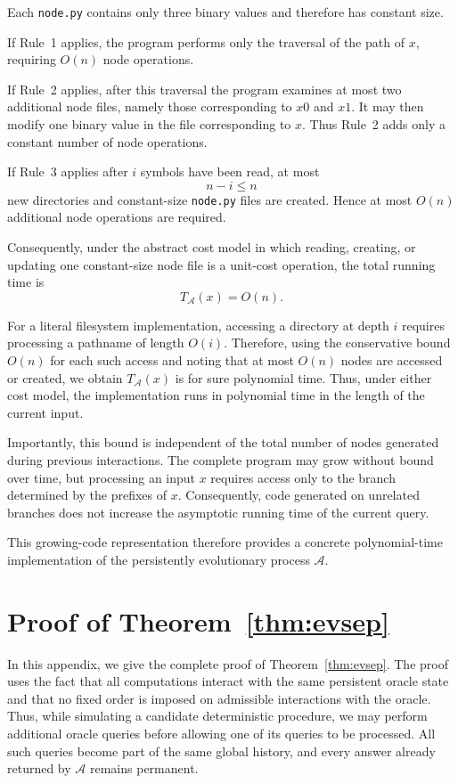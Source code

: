 \documentclass[11pt]{article}
\begin{document}
Each \texttt{node.py} contains only three binary values and therefore has
constant size.

If Rule~1 applies, the program performs only the traversal of the path of
\(x\), requiring \(O(n)\) node operations.

If Rule~2 applies, after this traversal the program examines at most two
additional node files, namely those corresponding to \(x0\) and \(x1\).
It may then modify one binary value in the file corresponding to \(x\).
Thus Rule~2 adds only a constant number of node operations.

If Rule~3 applies after \(i\) symbols have been read, at most
\[
n-i\le n
\]
new directories and constant-size \texttt{node.py} files are created.
Hence at most \(O(n)\) additional node operations are required.

Consequently, under the abstract cost model in which reading, creating, or
updating one constant-size node file is a unit-cost operation, the total
running time is
\[
T_{\mathcal A}(x)=O(n).
\]

For a literal filesystem implementation, accessing a directory at depth
\(i\)  requires processing a pathname of length \(O(i)\). Therefore, using the
conservative bound \(O(n)\) for each such access and noting that at most
\(O(n)\) nodes are accessed or created, we obtain
\(
T_{\mathcal A}(x)
\) is for sure polynomial time. 
Thus, under either cost model, the implementation runs in polynomial time
in the length of the current input.

Importantly, this bound is independent of the total number of nodes
generated during previous interactions.  The complete program may grow
without bound over time, but processing an input \(x\) requires access only
to the branch determined by the prefixes of \(x\).  Consequently, code
generated on unrelated branches does not increase the asymptotic running
time of the current query.

This growing-code representation therefore provides a concrete
polynomial-time implementation of the persistently evolutionary process
\(\mathcal A\).

\section{Proof of Theorem~\ref{thm:evsep}}
\label{app:evolutionary-separation}

In this appendix, we give the complete proof of
Theorem~\ref{thm:evsep}. The proof uses the fact that all computations
interact with the same persistent oracle state and that no fixed order is
imposed on admissible interactions with the oracle. Thus, while simulating
a candidate deterministic procedure, we may perform additional oracle
queries before allowing one of its queries to be processed. All such
queries become part of the same global history, and every answer already
returned by \(\mathcal A\) remains permanent.
\end{document}
